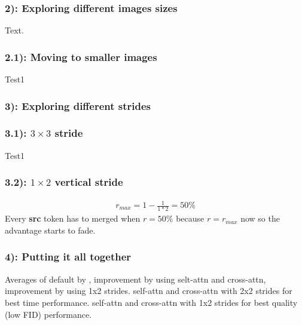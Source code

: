 \newpage
\subsubsection*{2): Exploring different images sizes}
Text.
\subsubsection*{2.1): Moving to smaller images}
Test1
\begin{figure}[!htb]
    
    
\end{figure}

\newpage
\subsubsection*{3): Exploring different strides}
\subsubsection*{3.1): $3 \times 3$ stride}
Test1
\subsubsection*{3.2): $1 \times 2$ vertical stride}
\begin{align*}
    r_{max} = 1-\frac{1}{1*2} = 50\%
\end{align*}
Every  \textbf{src} token has to merged when \(r=50\%\) because \(r=r_{max}\) now so the advantage starts to fade.

\begin{figure}[!htb]
    
    
\end{figure}

\newpage
\subsubsection*{4): Putting it all together}
Averages of default by \cite{bolya2023tomesd}, improvement by using selt-attn and cross-attn, improvement by using 1x2 strides. 
self-attn and cross-attn with 2x2 strides for best time performance. self-attn and cross-attn with 1x2 strides for best quality (low FID) performance.
\begin{figure}[!htb]
    
    
\end{figure}